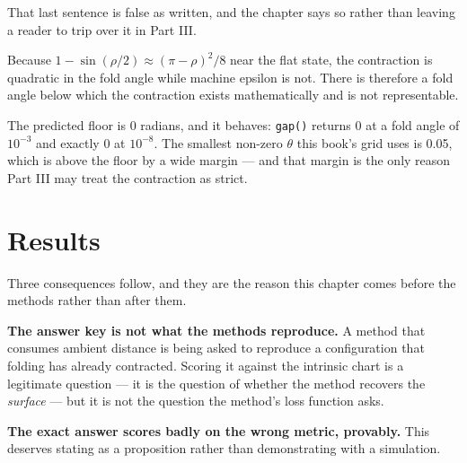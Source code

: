 \documentclass[
  british,
  a4paper,
]{book}
\newenvironment{Shaded}{\begin{snugshade}}{\end{snugshade}}
\newcommand{\CommentTok}[1]{\textcolor[rgb]{0.56,0.35,0.01}{\textit{#1}}}
\newcommand{\ControlFlowTok}[1]{\textcolor[rgb]{0.13,0.29,0.53}{\textbf{#1}}}
\newcommand{\DecValTok}[1]{\textcolor[rgb]{0.00,0.00,0.81}{#1}}
\newcommand{\FunctionTok}[1]{\textcolor[rgb]{0.13,0.29,0.53}{\textbf{#1}}}
\newcommand{\NormalTok}[1]{#1}
\newcommand{\OtherTok}[1]{\textcolor[rgb]{0.56,0.35,0.01}{#1}}
\newcommand{\SpecialCharTok}[1]{\textcolor[rgb]{0.81,0.36,0.00}{\textbf{#1}}}
\begin{document}
That last sentence is false as written, and the chapter says so rather than
leaving a reader to trip over it in Part III.

Because \(1 - \sin(\rho/2) \approx (\pi - \rho)^2/8\) near the flat state, the
contraction is quadratic in the fold angle while machine epsilon is not. There
is therefore a fold angle below which the contraction exists mathematically and
is not representable.

\begin{Shaded}
\end{Shaded}

The predicted floor is 0 radians, and it behaves:
\texttt{gap()} returns 0 at a fold angle of \(10^{-3}\) and exactly
0 at \(10^{-8}\). The smallest non-zero \(\theta\) this book's grid uses
is 0.05, which is above the floor by a wide margin --- and that margin is
the only reason Part III may treat the contraction as strict.

\section{Results}\label{geom-results}

Three consequences follow, and they are the reason this chapter comes before the
methods rather than after them.

\textbf{The answer key is not what the methods reproduce.} A method that consumes
ambient distance is being asked to reproduce a configuration that folding has
already contracted. Scoring it against the intrinsic chart is a legitimate
question --- it is the question of whether the method recovers the \emph{surface} --- but
it is not the question the method's loss function asks.

\textbf{The exact answer scores badly on the wrong metric, provably.} This deserves
stating as a proposition rather than demonstrating with a simulation.
\end{document}
